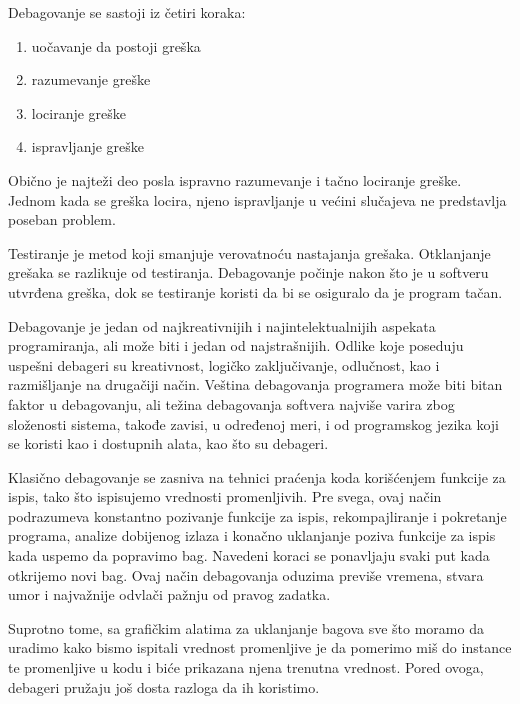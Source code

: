 \documentclass[a4paper]{article}
\begin{document}
\vspace{4mm}
Debagovanje se sastoji iz četiri koraka:
\begin{enumerate}
\item uočavanje da postoji greška
\item razumevanje greške
\item lociranje greške
\item ispravljanje greške
\end{enumerate}

\vspace{4mm}

Obično je najteži deo posla ispravno razumevanje i tačno lociranje greške. Jednom kada 
se greška locira, njeno ispravljanje u većini slučajeva ne predstavlja poseban problem.

Testiranje je metod koji smanjuje verovatnoću nastajanja grešaka.
Otklanjanje grešaka se razlikuje od testiranja. Debagovanje počinje
nakon što je u softveru utvrđena greška, dok se testiranje koristi da bi
se osiguralo da je program tačan.

Debagovanje je jedan od najkreativnijih i najintelektualnijih aspekata programiranja, 
ali može biti i jedan od najstrašnijih. Odlike koje poseduju uspešni debageri su 
kreativnost, logičko zaključivanje, odlučnost, kao i razmišljanje na drugačiji način.
Veština debagovanja programera može biti bitan faktor u debagovanju, ali težina 
debagovanja softvera najviše varira zbog složenosti sistema, takođe zavisi, u određenoj 
meri, i od programskog jezika koji se koristi kao i dostupnih alata, kao što su 
debageri. 

Klasično debagovanje se zasniva na tehnici praćenja koda korišćenjem funkcije za ispis, tako što 
ispisujemo vrednosti promenljivih. Pre svega, ovaj način podrazumeva konstantno pozivanje funkcije za 
ispis, rekompajliranje i pokretanje programa, analize dobijenog izlaza i konačno uklanjanje 
poziva funkcije za ispis kada uspemo da popravimo bag. Navedeni koraci se ponavljaju svaki put 
kada otkrijemo novi bag. Ovaj način debagovanja oduzima previše vremena, stvara umor i najvažnije
odvlači pažnju od pravog zadatka.

Suprotno tome, sa grafičkim alatima za uklanjanje bagova sve što moramo da uradimo kako bismo 
ispitali vrednost promenljive je da pomerimo miš do instance te promenljive u kodu i biće
prikazana njena trenutna vrednost. Pored ovoga, debageri pružaju još dosta razloga da ih koristimo.
\end{document}
